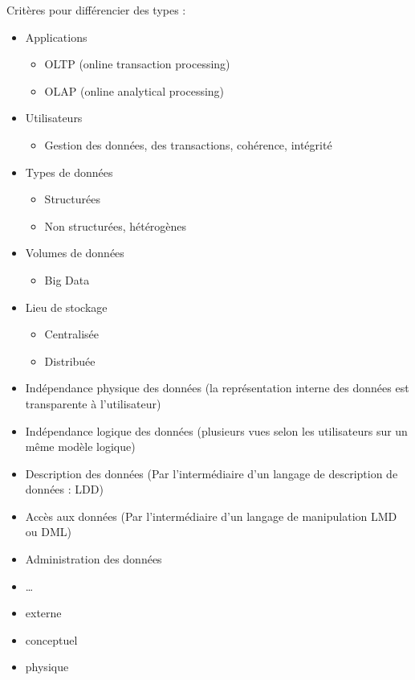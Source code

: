  Critères pour différencier des types :
\begin{itemize}
	\item Applications
	\begin{itemize}
		\item OLTP (online transaction processing)
		\item OLAP (online analytical processing)
	\end{itemize}
	\item Utilisateurs
	\begin{itemize}
		\item Gestion des données, des transactions, cohérence, intégrité
	\end{itemize}
	\item Types de données
	\begin{itemize}
		\item Structurées
		\item Non structurées, hétérogènes
	\end{itemize}
	\item Volumes de données
	\begin{itemize}
		\item Big Data
	\end{itemize}
	\item Lieu de stockage
	\begin{itemize}
		\item Centralisée
		\item Distribuée
	\end{itemize}
\end{itemize}

\begin{itemize}
	\item Indépendance physique des données (la représentation interne des données est transparente à l'utilisateur)
	\item Indépendance logique des données (plusieurs vues selon les utilisateurs sur un même modèle logique)
	\item Description des données (Par l'intermédiaire d'un langage de description de données : LDD)
	\item Accès aux données (Par l'intermédiaire d'un langage de manipulation LMD ou DML)
	\item Administration des données
	\item \ldots
\end{itemize}

\begin{itemize}
	\item externe
	\item conceptuel
	\item physique
\end{itemize}

